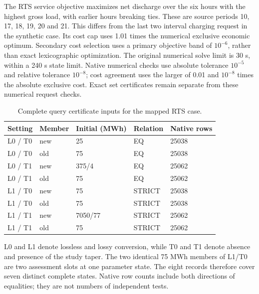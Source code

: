 The RTS service objective maximizes net discharge over the six hours with
the highest gross load, with earlier hours breaking ties. These are source
periods 10, 17, 18, 19, 20 and 21. This differs from the last two interval
charging request in the synthetic case. Its cost cap uses 1.01 times the
numerical exclusive economic optimum. Secondary cost selection uses a
primary objective band of $10^{-6}$, rather than exact lexicographic
optimization. The original numerical solve limit is 30 s, within a
240 s state limit. Native numerical checks use absolute tolerance $10^{-5}$
and relative tolerance $10^{-8}$; cost agreement uses the larger of 0.01
and $10^{-8}$ times the absolute exclusive cost. Exact set certificates
remain separate from these numerical request checks.
\begin{table}[htbp]
\caption{Complete query certificate inputs for the mapped RTS case.}\label{tab:rts_certificate_inputs}
\begin{tabular}{lllll}
\toprule
Setting & Member & Initial (MWh) & Relation & Native rows\\\midrule
L0 / T0 & new & 25 & EQ & 25038\\
L0 / T0 & old & 75 & EQ & 25038\\
L0 / T1 & new & 375/4 & EQ & 25062\\
L0 / T1 & old & 75 & EQ & 25062\\
L1 / T0 & new & 75 & STRICT & 25038\\
L1 / T0 & old & 75 & STRICT & 25038\\
L1 / T1 & new & 7050/77 & STRICT & 25062\\
L1 / T1 & old & 75 & STRICT & 25062\\
\bottomrule\end{tabular}\end{table}

L0 and L1 denote lossless and lossy conversion, while T0 and T1 denote
absence and presence of the study taper. The two identical 75 MWh members
of L1/T0 are two assessment slots at one parameter state. The eight records
therefore cover seven distinct complete states. Native row counts include
both directions of equalities; they are not numbers of independent tests.

